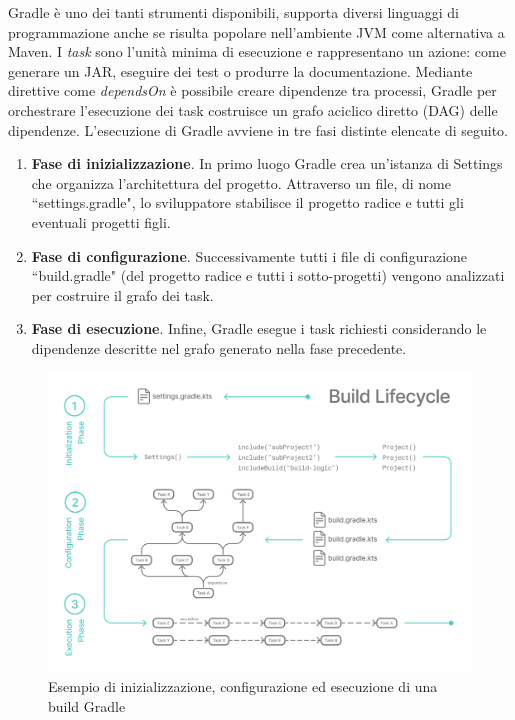 Gradle è uno dei tanti strumenti disponibili, supporta diversi linguaggi di programmazione anche se risulta popolare nell'ambiente JVM come alternativa a Maven. I \textit{task} sono l'unità minima di esecuzione e rappresentano un azione: come generare un JAR, eseguire dei test o produrre la documentazione. Mediante direttive come \textit{dependsOn} è possibile creare dipendenze tra processi, Gradle per orchestrare l'esecuzione dei task costruisce un grafo aciclico diretto (DAG) delle dipendenze. L'esecuzione di Gradle avviene in tre fasi distinte elencate di seguito.
\begin{enumerate}
	\item \textbf{Fase di inizializzazione}. In primo luogo Gradle crea un'istanza di Settings che organizza l'architettura del progetto. Attraverso un file, di nome ``settings.gradle", lo sviluppatore stabilisce il progetto radice e tutti gli eventuali progetti figli. 
	\item \textbf{Fase di configurazione}. Successivamente tutti i file di configurazione ``build.gradle" (del progetto radice e tutti i sotto-progetti) vengono analizzati per costruire il grafo dei task.
	\item \textbf{Fase di esecuzione}. Infine, Gradle esegue i task richiesti considerando le dipendenze descritte nel grafo generato nella fase precedente.
\end{enumerate}

\begin{figure}[htb]
	\centering
	\includegraphics[width=.9\linewidth]{figures/gradle-build-lifecycle-example.png}
	\caption{Esempio di inizializzazione, configurazione ed esecuzione di una build Gradle}
	\label{fig:gradle-build-lifecycle}
\end{figure}

